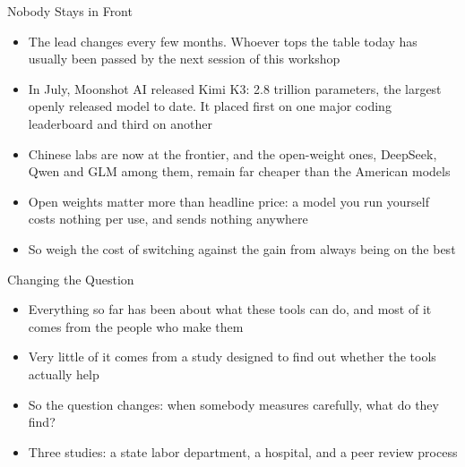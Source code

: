 \documentclass[aspectratio=169]{beamer}
\begin{document}
\begin{frame}{Nobody Stays in Front}
    \begin{itemize}\setlength{\itemsep}{7pt}
        \item The lead changes every few months. Whoever tops the table today has usually
              been passed by the next session of this workshop
        \item In July, Moonshot AI released Kimi K3: 2.8 trillion parameters, the largest
              openly released model to date. It placed first on one major coding leaderboard
              and third on another
        \item Chinese labs are now at the frontier, and the open-weight ones,
              DeepSeek, Qwen and GLM among them, remain far cheaper than the American models
        \item Open weights matter more than headline price: a model you run yourself costs
              nothing per use, and sends nothing anywhere
        \item So weigh the cost of switching against the gain from always being on the best
    \end{itemize}
\end{frame}


\begin{frame}{Changing the Question}
    \begin{itemize}\setlength{\itemsep}{8pt}
        \item Everything so far has been about what these tools can do, and most of it comes
              from the people who make them
        \item Very little of it comes from a study designed to find out whether the tools
              actually help
        \item So the question changes: when somebody measures carefully, what do they find?
        \item Three studies: a state labor department, a hospital, and a peer review process
    \end{itemize}
\end{frame}
\end{document}
